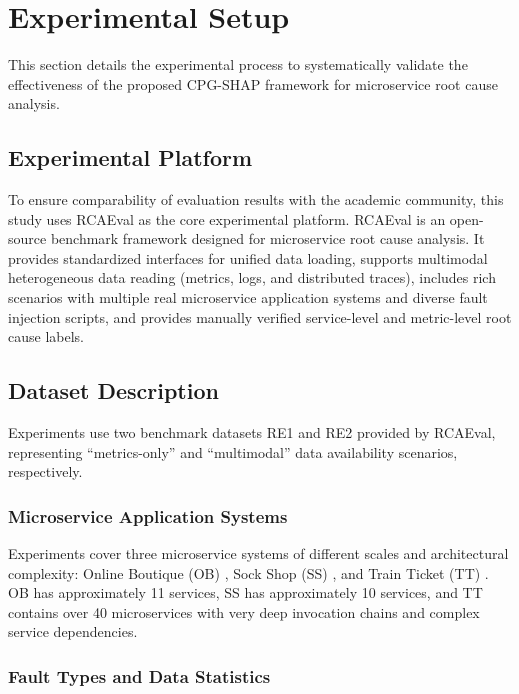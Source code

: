 \documentclass[conference]{IEEEtran}
\begin{document}
\section{Experimental Setup}

This section details the experimental process to systematically validate the effectiveness of the proposed CPG-SHAP framework for microservice root cause analysis.

\subsection{Experimental Platform}

To ensure comparability of evaluation results with the academic community, this study uses RCAEval \cite{li2024} as the core experimental platform. RCAEval is an open-source benchmark framework designed for microservice root cause analysis. It provides standardized interfaces for unified data loading, supports multimodal heterogeneous data reading (metrics, logs, and distributed traces), includes rich scenarios with multiple real microservice application systems and diverse fault injection scripts, and provides manually verified service-level and metric-level root cause labels.

\subsection{Dataset Description}

Experiments use two benchmark datasets RE1 and RE2 provided by RCAEval, representing ``metrics-only'' and ``multimodal'' data availability scenarios, respectively.

\subsubsection{Microservice Application Systems}

Experiments cover three microservice systems of different scales and architectural complexity: Online Boutique (OB) \cite{onlineboutique}, Sock Shop (SS) \cite{sockshop}, and Train Ticket (TT) \cite{trainticket}. OB has approximately 11 services, SS has approximately 10 services, and TT contains over 40 microservices with very deep invocation chains and complex service dependencies.

\subsubsection{Fault Types and Data Statistics}
\end{document}
